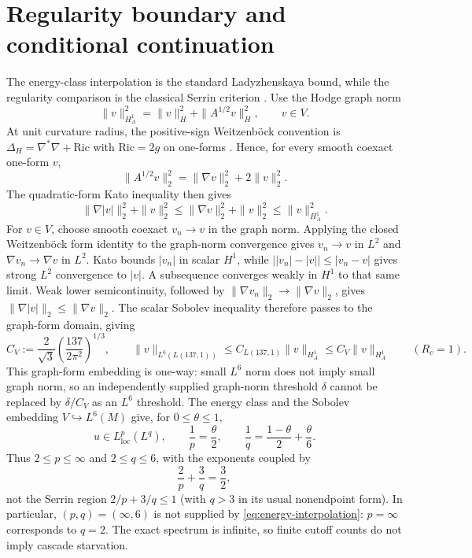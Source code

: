 \documentclass[12pt]{article}
\theoremstyle{definition}
\theoremstyle{remark}
\begin{document}
\section{Regularity boundary and conditional continuation}\label{sec:regularity}

The energy-class interpolation is the standard Ladyzhenskaya bound, while the
regularity comparison is the classical Serrin criterion
\cite{Ladyzhenskaya1969,Serrin1962}.  Use the Hodge graph norm
\[
 \|v\|_{H_A^1}^2=\|v\|_H^2+\|A^{1/2}v\|_H^2,
 \qquad v\in V.
\]
At unit curvature radius, the positive-sign Weitzenb\"ock convention is
$\Delta_H=\nabla^*\nabla+\mathrm{Ric}$ with $\mathrm{Ric}=2g$ on one-forms
\cite[Section~2.2, Theorems~2.6--2.7]{Aino2021}.  Hence, for every smooth
coexact one-form $v$,
\[
 \|A^{1/2}v\|_2^2=\|\nabla v\|_2^2+2\|v\|_2^2.
\]
The quadratic-form Kato inequality
\cite[Corollary~2.5]{Guneysu2014Kato} then gives
\[
 \|\nabla|v|\|_2^2+\|v\|_2^2
 \le \|\nabla v\|_2^2+\|v\|_2^2
 \le \|v\|_{H_A^1}^2.
\]
For $v\in V$, choose smooth coexact $v_n\to v$ in the graph norm.  Applying
the closed Weitzenb\"ock form identity to the graph-norm convergence gives
$v_n\to v$ in $L^2$ and
$\nabla v_n\to\nabla v$ in $L^2$.  Kato bounds $|v_n|$ in scalar $H^1$, while
$\bigl||v_n|-|v|\bigr|\le|v_n-v|$ gives strong $L^2$ convergence to $|v|$.
A subsequence converges weakly in $H^1$ to that same limit.  Weak lower
semicontinuity, followed by
$\|\nabla v_n\|_2\to\|\nabla v\|_2$, gives
$\|\nabla|v|\|_2\le\|\nabla v\|_2$.  The scalar Sobolev inequality therefore
passes to the graph-form domain, giving
\begin{equation}\label{eq:graph-embedding}
 C_V:=\frac2{\sqrt3}\left(\frac{137}{2\pi^2}\right)^{1/3},
 \qquad
 \|v\|_{L^6(L(137,1))}
 \le C_{L(137,1)}\|v\|_{H_A^1}
 \le C_V\|v\|_{H_A^1}
 \qquad (R_c=1).
\end{equation}
This graph-form embedding is one-way: small $L^6$ norm does not imply small
graph norm, so an independently supplied graph-norm threshold $\delta$ cannot
be replaced by $\delta/C_V$ as an $L^6$ threshold.  The energy class and the Sobolev
embedding $V\hookrightarrow L^6(M)$ give,
for $0\le\theta\le1$,
\begin{equation}\label{eq:energy-interpolation}
 u\in L^p_{\mathrm{loc}}(L^q),\qquad
 \frac1p=\frac\theta2,\qquad
 \frac1q=\frac{1-\theta}{2}+\frac\theta6.
\end{equation}
Thus $2\le p\le\infty$ and $2\le q\le6$, with the exponents coupled by
\[
 \frac2p+\frac3q=\frac32,
\]
not the Serrin region $2/p+3/q\le1$ (with $q>3$ in its usual nonendpoint
form).  In particular, $(p,q)=(\infty,6)$ is not supplied by
\eqref{eq:energy-interpolation}: $p=\infty$ corresponds to $q=2$.  The exact
spectrum is infinite, so finite cutoff counts do not imply cascade starvation.
\end{document}
